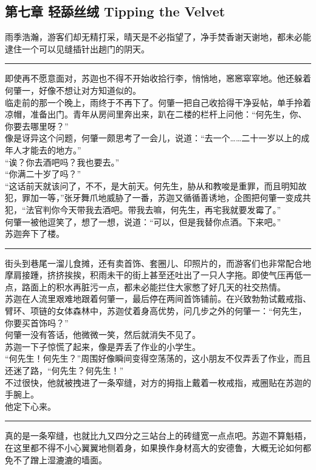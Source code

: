 \documentclass[oneside,11pt]{memoir} %
\begin{document}
\begin{CJK}{UTF8}{gbsn}
\chapter*{第七章    轻舔丝绒    Tipping the Velvet}
雨季浩瀚，游客们却无精打采，晴天是不必指望了，净手焚香谢天谢地，都未必能逮住一个可以见缝插针出趟门的阴天。\\\indent
\rule{-3pt}{30pt}
    即使再不愿意面对，苏迦也不得不开始收拾行李，悄悄地，窸窸窣窣地。他还躲着何肇一，好像不想让对方知道似的。 \\\indent   
    临走前的那一个晚上，雨终于不再下了。何肇一把自己收拾得干净妥帖，单手拎着凉帽，准备出门。青年从房间里奔出来，趴在二楼的栏杆上问他：“何先生，你、你要去哪里呀？”\\\indent
    像是讶异这个问题，何肇一颇思考了一会儿，说道：“去一个……二十一岁以上的成年人才能去的地方。”\\\indent
    “诶？你去酒吧吗？我也要去。”\\\indent
    “你满二十岁了吗？”\\\indent
    “这话前天就该问了，不不，是大前天。何先生，胁从和教唆是重罪，而且明知故犯，罪加一等，”张牙舞爪地威胁了一番，苏迦又循循善诱地，企图把何肇一变成共犯，“法官判你今天带我去酒吧。带我去嘛，何先生，再宅我就要发霉了。”\\\indent
    何肇一被他逗笑了，想了一想，说道：“可以，但是我替你点酒。下来吧。”\\\indent
    苏迦奔下了楼。\\\indent
\rule{-3pt}{30pt}
    街头到巷尾一溜儿食摊，还有卖首饰、套圈儿、印照片的，而游客们也非常配合地摩肩接踵，挤挤挨挨，积雨未干的街上甚至还吐出了一只人字拖。即使气压再低一点，路面上的积水再脏污一点，都未必能拦住大家憋了好几天的社交热情。\\\indent
    苏迦在人流里艰难地跟着何肇一，最后停在两间首饰铺前。在兴致勃勃试戴戒指、臂环、项链的女体森林中，苏迦仗着身高优势，问几步之外的何肇一：“何先生，你要买首饰吗？”\\\indent
    何肇一没有答话，他微微一笑，然后就消失不见了。\\\indent
    苏迦一下子惊慌了起来，像是弄丢了作业的小学生。\\\indent
    “何先生！何先生？”周围好像瞬间变得空荡荡的，这小朋友不仅弄丢了作业，而且还迷了路，“何先生？何先生！”\\\indent
    不过很快，他就被拽进了一条窄缝，对方的拇指上戴着一枚戒指，戒圈贴在苏迦的手腕上。\\\indent
    他定下心来。
\rule{-3pt}{30pt}
    真的是一条窄缝，也就比九又四分之三站台上的砖缝宽一点点吧。苏迦不算魁梧，在这里都不得不小心翼翼地侧着身，如果换作身材高大的安德鲁，大概无论如何都免不了蹭上湿漉漉的墙面。\\\indent

\end{CJK}
\end{document}
